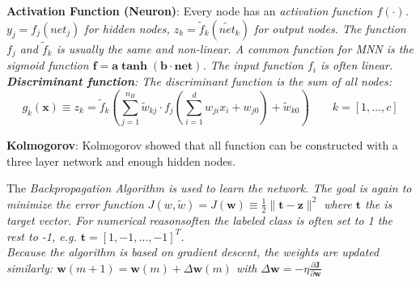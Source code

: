   \textbf{Activation Function (Neuron)}: Every node has an \em activation function $f(\cdot)$\em. 
  $y_j=f_j(net_j)$ for hidden nodes, $z_k=\tilde f_k(\tilde{net}_k)$ for output nodes.  
  The function $f_j$ and $\tilde f_k$ is usually the same and non-linear. 
  A common function for MNN is the sigmoid function $\bm{f=a \tanh(b \cdot net)}$.
  The input function $f_i$ is often linear. \\
  
  \textbf{Discriminant function}: The \em discriminant function \em is the sum of all nodes:
  $$ g_k(\bm x) \equiv z_k = \tilde f_k\left( \sum\limits_{j=1}^{n_H} \tilde{w}_{kj} \cdot f_j 
    \left( \sum\limits_{i=1}^d w_{ji} x_i +w_{j0} \right)+ \tilde{w}_{k0} \right) \qquad k=[1,\ldots,c]$$ 
  
  \textbf{Kolmogorov}: Kolmogorov showed that all function can be constructed with a three layer network and enough hidden nodes.
  
 The \em Backpropagation Algorithm \em is used to learn the network.
 The goal is again to minimize the error function $J( w, \tilde{w})=J(\bm w)\equiv \frac{1}{2}\| \bm t - \bm z \|^2 $ where $\bm t$ the is target vector. For numerical 
 reasonsoften the labeled class is often set to 1 the rest to -1, e.g. $\bm t =[1,-1,\ldots,-1]^T$. \\
 Because the algorithm is based on gradient descent, the weights are updated similarly:
 $\bm w(m+1)=\bm w(m)+\Delta \bm w(m)$ with $\Delta \bm w = -\eta \frac{\partial \bm J}{\partial \bm w}$\\
